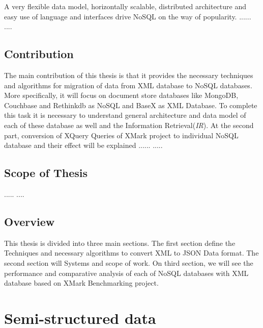 \documentclass[a4paper,12pt]{article}
\begin{document}
			A very flexible data model, horizontally scalable, distributed architecture and easy use of language and interfaces drive NoSQL on the way of popularity.  
			......
			....
	
	\subsection{Contribution}
		The main contribution of this thesis is that it provides the necessary techniques and algorithms for migration of data from XML database to NoSQL databases.  More specifically, it will focus on document store databases like MongoDB, Couchbase and Rethinkdb as NoSQL and BaseX as XML Database. To complete this task it is necessary to understand general architecture and data model of each of these database as well and the Information Retrieval(\textit{IR}).
		At the second part, conversion of XQuery Queries of XMark project to individual NoSQL database and their effect will be explained
		......
		.....
		
	\subsection{Scope of Thesis}
	.....
	....
	\subsection{Overview}
		This thesis is divided into three main sections. The first section define the Techniques and necessary algorithms to convert XML  to JSON Data format. The second section will Systems and scope of work. On third section, we will see the performance and comparative analysis of each of NoSQL databases with XML database based on XMark Benchmarking project.
		
		
	\newpage
	\section{Semi-structured data}

\end{document}
